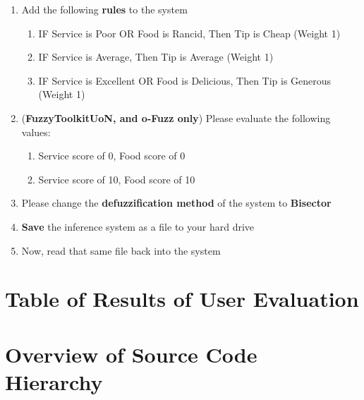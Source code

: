 \begin{enumerate}
\begin{enumerate}
\begin{tabular}{ll}
	\end{tabular}			
	\end{enumerate}	
\item Add the following \textbf{rules} to the system
	\begin{enumerate}
	\item IF Service is Poor OR Food is Rancid, Then Tip is Cheap (Weight 1)
	\item IF Service is Average, Then Tip is Average (Weight 1)
	\item IF Service is Excellent OR Food is Delicious, Then Tip is Generous (Weight 1)
	\end{enumerate}
\item (\textbf{FuzzyToolkitUoN, and o-Fuzz only}) Please evaluate the following values:
	\begin{enumerate}
	\item Service score of 0, Food score of 0
	\item Service score of 10, Food score of 10
	\end{enumerate}
\item Please change the \textbf{defuzzification method}	of the system to \textbf{Bisector}
\item \textbf{Save} the inference system as a file to your hard drive
\item Now, read that same file back into the system
\end{enumerate}

\newpage
\section{Table of Results of User Evaluation}

\section{Overview of Source Code Hierarchy}

\newpage 
